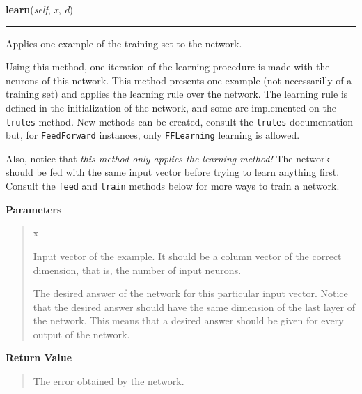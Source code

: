     \begin{boxedminipage}{\textwidth}

    \raggedright \textbf{learn}(\textit{self}, \textit{x}, \textit{d})

    \vspace{-1.5ex}

    \rule{\textwidth}{0.5\fboxrule}

Applies one example of the training set to the network.

Using this method, one iteration of the learning procedure is made with
the neurons of this network. This method presents one example (not
necessarilly of a training set) and applies the learning rule over the
network. The learning rule is defined in the initialization of the
network, and some are implemented on the \texttt{lrules} method. New methods
can be created, consult the \texttt{lrules} documentation but, for
\texttt{FeedForward} instances, only \texttt{FFLearning} learning is allowed.

Also, notice that \emph{this method only applies the learning method!} The
network should be fed with the same input vector before trying to learn
anything first. Consult the \texttt{feed} and \texttt{train} methods below for
more ways to train a network.
    \vspace{1ex}

      \textbf{Parameters}
      \begin{quote}
        \begin{Ventry}{x}

          \item[x]


Input vector of the example. It should be a column vector of the
correct dimension, that is, the number of input neurons.
          \item[d]


The desired answer of the network for this particular input vector.
Notice that the desired answer should have the same dimension of the
last layer of the network. This means that a desired answer should
be given for every output of the network.
        \end{Ventry}

      \end{quote}

    \vspace{1ex}

      \textbf{Return Value}
      \begin{quote}

The error obtained by the network.
      \end{quote}

    \vspace{1ex}

    \end{boxedminipage}

